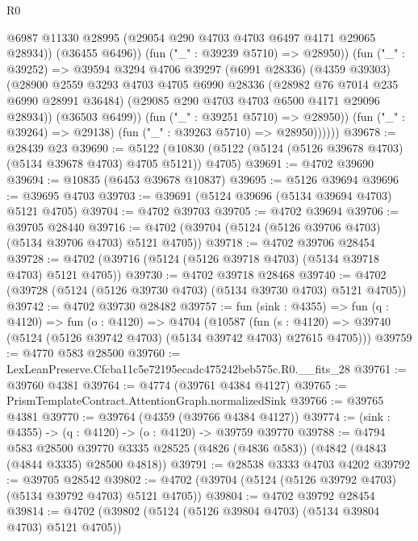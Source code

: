 \begin{lexlean}{R0}
\begin{coremodule}
                      @6987
                      @11330
                      @28995
                      (@29054 @290 @4703 @4703 @6497 @4171 @29065 @28934))
                    (@36455 @6496))
                  (fun ("_" : @39239 @5710) => @28950))
                (fun ("_" : @39252) =>
                @39594
                  @3294
                  @4706
                  @39297
                  (@6991 @28336)
                  (@4359 @39303)
                  (@28900
                    @2559
                    @3293
                    @4703
                    @4705
                    @6990
                    @28336
                    (@28982 @76 @7014 @235 @6990 @28991 @36484)
                    (@29085 @290 @4703 @4703 @6500 @4171 @29096 @28934))
                  (@36503 @6499))
                (fun ("_" : @39251 @5710) => @28950))
              (fun ("_" : @39264) => @29138)
              (fun ("_" : @39263 @5710) => @28950))))))
@39678 := @28439 @23
@39690 := @5122 (@10830 (@5122 (@5124 (@5126 @39678 @4703) (@5134 @39678 @4703) @4705 @5121)) @4705)
@39691 := @4702 @39690
@39694 := @10835 (@6453 @39678 @10837)
@39695 := @5126 @39694
@39696 := @39695 @4703
@39703 := @39691 (@5124 @39696 (@5134 @39694 @4703) @5121 @4705)
@39704 := @4702 @39703
@39705 := @4702 @39694
@39706 := @39705 @28440
@39716 := @4702 (@39704 (@5124 (@5126 @39706 @4703) (@5134 @39706 @4703) @5121 @4705))
@39718 := @4702 @39706 @28454
@39728 := @4702 (@39716 (@5124 (@5126 @39718 @4703) (@5134 @39718 @4703) @5121 @4705))
@39730 := @4702 @39718 @28468
@39740 := @4702 (@39728 (@5124 (@5126 @39730 @4703) (@5134 @39730 @4703) @5121 @4705))
@39742 := @4702 @39730 @28482
@39757 := fun (sink : @4355) =>
  fun (q : @4120) =>
  fun (o : @4120) =>
  @4704
    (@10587
      (fun (s : @4120) => @39740 (@5124 (@5126 @39742 @4703) (@5134 @39742 @4703) @27615 @4705)))
@39759 := @4770 @583 @28500
@39760 := LexLeanPreserve.Cfcba11c5e72195ecadc475242beb575c.R0.__fits_28
@39761 := @39760 @4381
@39764 := @4774 (@39761 @4384 @4127)
@39765 := PrismTemplateContract.AttentionGraph.normalizedSink
@39766 := @39765 @4381
@39770 := @39764 (@4359 (@39766 @4384 @4127))
@39774 := (sink : @4355) -> (q : @4120) -> (o : @4120) -> @39759 @39770
@39788 := @4794
    @583
    @28500
    @39770
    @3335
    @28525
    (@4826 (@4836 @583))
    (@4842 (@4843 (@4844 @3335) @28500 @4818))
@39791 := @28538 @3333 @4703 @4202
@39792 := @39705 @28542
@39802 := @4702 (@39704 (@5124 (@5126 @39792 @4703) (@5134 @39792 @4703) @5121 @4705))
@39804 := @4702 @39792 @28454
@39814 := @4702 (@39802 (@5124 (@5126 @39804 @4703) (@5134 @39804 @4703) @5121 @4705))

\end{coremodule}
\end{lexlean}
